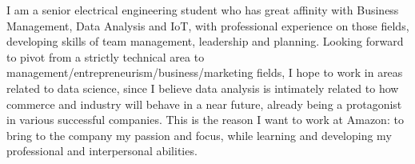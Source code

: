 

\begin{cvparagraph}

I am a senior electrical engineering student who has great affinity with Business Management, Data Analysis and IoT, with professional experience on those fields, developing skills of team management, leadership and planning. Looking forward to pivot from a strictly technical area to management/entrepreneurism/business/marketing fields, I hope to work in areas related to data science, since I believe data analysis is intimately related to how commerce and industry will behave in a near future, already being a protagonist in various successful companies. This is the reason I want to work at Amazon: to bring to the company my passion and focus, while learning and developing my professional and interpersonal abilities.
\end{cvparagraph}
